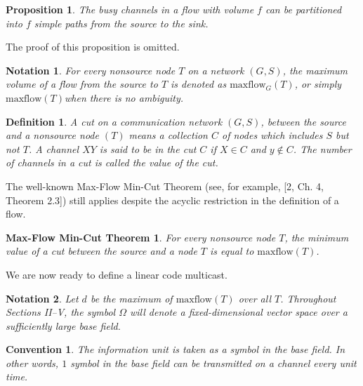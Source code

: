 \documentclass{IEEEtran}
\newtheorem{prop}{Proposition}
\newtheorem{nota}{Notation}
\newtheorem{defi}{Definition}
\newtheorem{conv}{Convention}
\newtheorem{maxthe}{Max-Flow Min-Cut Theorem}
\begin{document}
\begin{prop}
The busy channels in a flow with volume $f$ can be partitioned into $f$ simple paths from the source to the sink.
\end{prop}
\par The proof of this proposition is omitted.
\begin{nota}
	For every nonsource node $T$ on a network $(G,S)$, the maximum volume of a flow from the source to $T$ is denoted as $\text{maxflow}_G(T)$, or simply $\text{maxflow}(T)$when there is no ambiguity.
\end{nota}
\begin{defi}
	A cut on a communication network $(G,S)$, between the source and a nonsource node $(T)$ means a collection $C$ of nodes which includes $S$ but not $T$. A channel $XY$ is said to be \emph{in} the cut $C$ if $X \in C$ and $y \notin C$. The number of channels in a cut is called the \emph{value} of the cut.
\end{defi}
\par
The well-known Max-Flow Min-Cut Theorem (see, for example, [2, Ch. 4, Theorem 2.3]) still applies despite the acyclic restriction in the definition of a flow.
\begin{maxthe}
	For every nonsource node $T$, the minimum value of a cut between the source and a node $T$ is equal to $\text{maxflow}(T)$.
\end{maxthe}

We are now ready to define a linear code multicast.
\begin{nota}
	Let $d$ be the maximum of $\text{maxflow}(T)$ over all $T$. Throughout Sections II–V, the symbol $\Omega$ will denote a fixed-dimensional vector space over a sufficiently large base field.
\end{nota}
\begin{conv}
	The information unit is taken as a symbol in the base field. In other words, $1$ symbol in the base field can be transmitted on a channel every unit time.
\end{conv}
\end{document}
